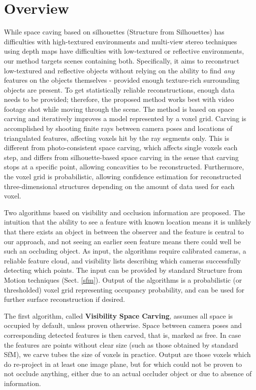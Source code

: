 
\section{Overview}  \label{method-overview}
While space caving based on silhouettes (Structure from Silhouettes) has difficulties with high-textured environments and multi-view stereo techniques using depth maps have difficulties with low-textured or reflective environments, our method targets scenes containing both. Specifically, it aims to reconstruct low-textured and reflective objects without relying on the ability to find \emph{any} features on the objects themselves - provided enough texture-rich surrounding objects are present. To get statistically reliable reconstructions, enough data needs to be provided; therefore, the proposed method works best with video footage shot while moving through the scene. The method is based on space carving and iteratively improves a model represented by a voxel grid. Carving is accomplished by shooting finite rays between camera poses and locations of triangulated features, affecting voxels hit by the ray segments only. This is different from photo-consistent space carving, which affects single voxels each step, and differs from silhouette-based space carving in the sense that carving stops at a specific point, allowing concavities to be reconstructed. Furthermore, the voxel grid is probabilistic, allowing confidence estimation for reconstructed three-dimensional structures depending on the amount of data used for each voxel.

Two algorithms based on visibility and occlusion information are proposed. The intuition that the ability to see a feature with known location means it is unlikely that there exists an object in between the observer and the feature is central to our approach, and not seeing an earlier seen feature means there could well be such an occluding object. As input, the algorithms require calibrated cameras, a reliable feature cloud, and visibility lists describing which cameras successfully detecting which points. The input can be provided by standard Structure from Motion techniques (Sect. \ref{sfm}). Output of the algorithms is a probabilistic (or thresholded) voxel grid representing occupancy probability, and can be used for further surface reconstruction if desired.

The first algorithm, called \textbf{Visibility Space Carving}, assumes all space is occupied by default, unless proven otherwise. Space between camera poses and corresponding detected features is then carved, that is, marked as free. In case the features are points without clear size (such as those obtained by standard SfM), we carve tubes the size of voxels in practice. Output are those voxels which do re-project in at least one image plane, but for which could not be proven to not occlude anything, either due to an actual occluder object or due to absence of information. 

